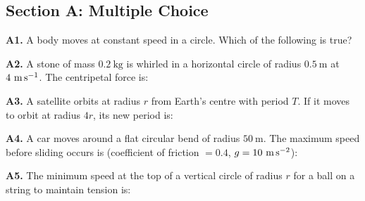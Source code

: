 \newpage
\begin{exercisebox}[6]

\subsection*{Section A: Multiple Choice}

\textbf{A1.} A body moves at constant speed in a
circle. Which of the following is true?


\vspace{0.4cm}

\textbf{A2.} A stone of mass $0.2\ \text{kg}$ is
whirled in a horizontal circle of radius $0.5\ \text{m}$
at $4\ \text{m\,s}^{-1}$. The centripetal force is:


\vspace{0.4cm}

\textbf{A3.} A satellite orbits at radius $r$ from
Earth's centre with period $T$. If it moves to orbit
at radius $4r$, its new period is:


\vspace{0.4cm}

\textbf{A4.} A car moves around a flat circular bend
of radius $50\ \text{m}$. The maximum speed before
sliding occurs is (coefficient of friction $= 0.4$,
$g = 10\ \text{m\,s}^{-2}$):


\vspace{0.4cm}

\textbf{A5.} The minimum speed at the top of a
vertical circle of radius $r$ for a ball on a
string to maintain tension is:



\end{exercisebox}
